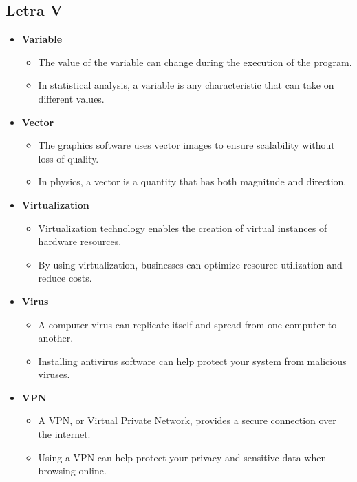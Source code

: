     \subsection{Letra V}
    \begin{itemize}
        \item \textbf{Variable}
        \begin{itemize}
            \item The value of the variable can change during the execution of the program.
            \item In statistical analysis, a variable is any characteristic that can take on different values.
        \end{itemize}
        \item \textbf{Vector}
        \begin{itemize}
            \item The graphics software uses vector images to ensure scalability without loss of quality.
            \item In physics, a vector is a quantity that has both magnitude and direction.
        \end{itemize}
        \item \textbf{Virtualization}
        \begin{itemize}
            \item Virtualization technology enables the creation of virtual instances of hardware resources.
            \item By using virtualization, businesses can optimize resource utilization and reduce costs.
        \end{itemize}
        \item \textbf{Virus}
        \begin{itemize}
            \item A computer virus can replicate itself and spread from one computer to another.
            \item Installing antivirus software can help protect your system from malicious viruses.
        \end{itemize}
        \item \textbf{VPN}
        \begin{itemize}
            \item A VPN, or Virtual Private Network, provides a secure connection over the internet.
            \item Using a VPN can help protect your privacy and sensitive data when browsing online.
        \end{itemize}
    \end{itemize}
